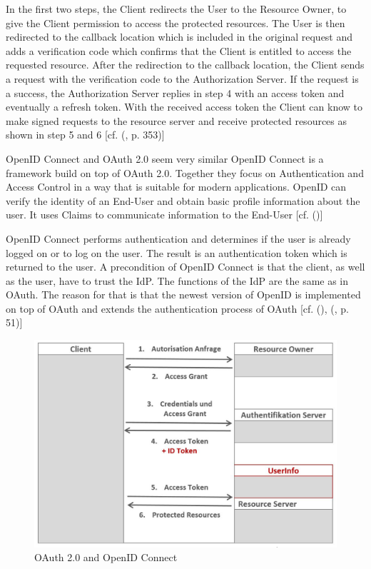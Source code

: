 {{		In the first two steps, the Client redirects the User to the Resource Owner, to give the Client permission to access the protected resources. The User is then redirected to the callback location which is included in the original request and adds a verification code which confirms that the Client is entitled to access the requested resource. After the redirection to the callback location, the Client sends a request with the verification code to the Authorization Server. If the request is a success, the Authorization Server replies in step 4 with an access token and eventually a refresh token. With the received access token the Client can know to make signed requests to the resource server and receive protected resources as shown in step 5 and 6 [cf. (\cite{LeBlanc:2011:SocialApplications}, p. 353)]
		
		OpenID Connect and OAuth 2.0 seem very similar OpenID Connect is a framework build on top of OAuth 2.0. Together they focus on Authentication and Access Control in a way that is suitable for modern applications. OpenID can verify the identity of an End-User and obtain basic profile information about the user. It uses Claims to communicate information to the End-User [cf. (\cite{Sakimura:2014:OpenIDConnect})]
		
		OpenID Connect performs authentication and determines if the user is already logged on or to log on the user. The result is an authentication token which is returned to the user. A precondition of OpenID Connect is that the client, as well as the user, have to trust the IdP. The functions of the IdP are the same as in OAuth. The reason for that is that the newest version of OpenID is implemented on top of OAuth and extends the authentication process of OAuth  [cf. (\cite{Sakimura:2014:OpenIDConnect}), (\cite{Boyd:2012:GSOAuth}, p. 51)]
		
		\begin{figure}[h]
			\centering
			\includegraphics[width=0.8\linewidth]{images/openid-process}
			\caption{OAuth 2.0 and OpenID Connect \cite{Lodderstedt:2014:OpenID}}
			\label{fig:openid-process}
		\end{figure}
		
}}
